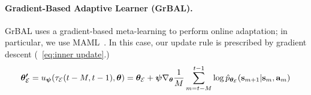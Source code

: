 \paragraph{Gradient-Based Adaptive Learner (GrBAL).} GrBAL uses a gradient-based meta-learning to perform online adaptation; in particular, we use MAML~\citep{finn2017maml}. In this case, our update rule is prescribed by gradient descent (~\ref{eq:inner update}.)
%
\begin{align}
\bm{\theta^\prime}_{\mathcal{E}} = u_{\bm{\psi}}(\tau_{\mathcal{E}}(t-M, t-1), \bm{\theta}) = \bm{\theta}_{\mathcal{E}} + \bm{\psi} \nabla_{\bm{\theta}} \frac{1}{M} 
\sum_{m=t-M}^{t-1}
\log \hat p_{\bm{\theta}_{\mathcal{E}}} ( {\bf s}_{m+1} | {\bf s}_{m}, {\bf a}_{m})
    \label{eq:inner update}
\vspace{-0.2in}
\end{align}
%
